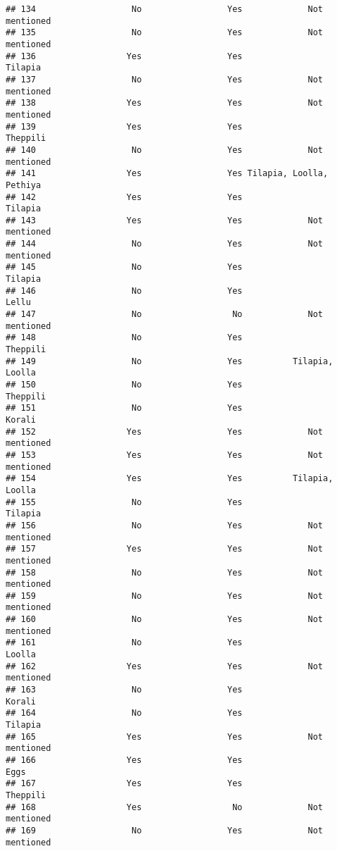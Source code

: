\documentclass[
]{article}
\begin{document}
\begin{verbatim}
## 134                   No                 Yes             Not mentioned
## 135                   No                 Yes             Not mentioned
## 136                  Yes                 Yes                  Tilapia 
## 137                   No                 Yes             Not mentioned
## 138                  Yes                 Yes             Not mentioned
## 139                  Yes                 Yes                 Theppili 
## 140                   No                 Yes             Not mentioned
## 141                  Yes                 Yes Tilapia, Loolla, Pethiya 
## 142                  Yes                 Yes                  Tilapia 
## 143                  Yes                 Yes             Not mentioned
## 144                   No                 Yes             Not mentioned
## 145                   No                 Yes                  Tilapia 
## 146                   No                 Yes                     Lellu
## 147                   No                  No             Not mentioned
## 148                   No                 Yes                 Theppili 
## 149                   No                 Yes          Tilapia, Loolla 
## 150                   No                 Yes                 Theppili 
## 151                   No                 Yes                    Korali
## 152                  Yes                 Yes             Not mentioned
## 153                  Yes                 Yes             Not mentioned
## 154                  Yes                 Yes          Tilapia, Loolla 
## 155                   No                 Yes                   Tilapia
## 156                   No                 Yes             Not mentioned
## 157                  Yes                 Yes             Not mentioned
## 158                   No                 Yes             Not mentioned
## 159                   No                 Yes             Not mentioned
## 160                   No                 Yes             Not mentioned
## 161                   No                 Yes                    Loolla
## 162                  Yes                 Yes             Not mentioned
## 163                   No                 Yes                   Korali 
## 164                   No                 Yes                   Tilapia
## 165                  Yes                 Yes             Not mentioned
## 166                  Yes                 Yes                      Eggs
## 167                  Yes                 Yes                 Theppili 
## 168                  Yes                  No             Not mentioned
## 169                   No                 Yes             Not mentioned

\end{verbatim}
\end{document}
